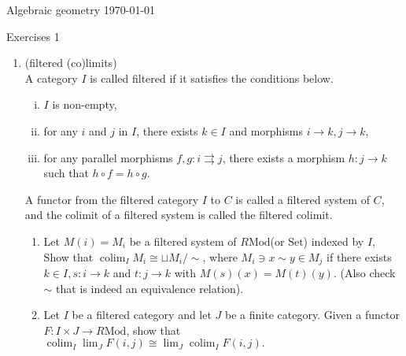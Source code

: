 \documentclass[a4paper,11pt]{article}
\def\mrm#1{\mathrm{#1}}
\def\Mod#1{#1\mathrm{Mod}}
\DeclareMathOperator{\colim}{colim}
\begin{document}
{\small Algebraic geometry \hfill \today \\}
\begin{center}
\Huge Exercises 1
\end{center}

\vskip0.6cm
\begin{enumerate}[1.]
\item (filtered (co)limits) \\
A category $I$ is called filtered if it satisfies the conditions below.
\begin{enumerate}[(i)]
    \item  $I$ is non-empty,
    \item  for any $i$ and $j$ in $I$, there exists $k \in I$ and morphisms $i \to k, j \to k$,
    \item for any parallel morphisms $f,g: i \rightrightarrows  j$, there exists a morphism $h: j \to
    k$ such that $h \circ  f = h \circ g$.
\end{enumerate}
A functor from the filtered category $I$ to $C$ is called a filtered system of $C$, and the colimit of a filtered system is called the filtered colimit.
\begin{enumerate}
    \item Let $M(i)=M_i$ be a filtered system of $\Mod{R}$(or $\mrm{Set}$) indexed by $I$, Show that $\colim_I M_i\cong \sqcup M_i/ \sim$, where $M_i \ni x \sim y \in M_j$ if there exists $k \in I, s: i \to k$ and $ t: j \to k$
    with $ M(s)(x) = M(t)(y)$. (Also check $\sim$ that is indeed an equivalence relation).
    \item Let $I$ be a filtered category and let $J$ be a finite category. Given a functor $F: I\times J \to \Mod{R}$, show that $\colim_I\lim_J F(i,j)\cong\lim_J\colim_I F(i,j).$
\end{enumerate}


\end{enumerate}
\end{document}

